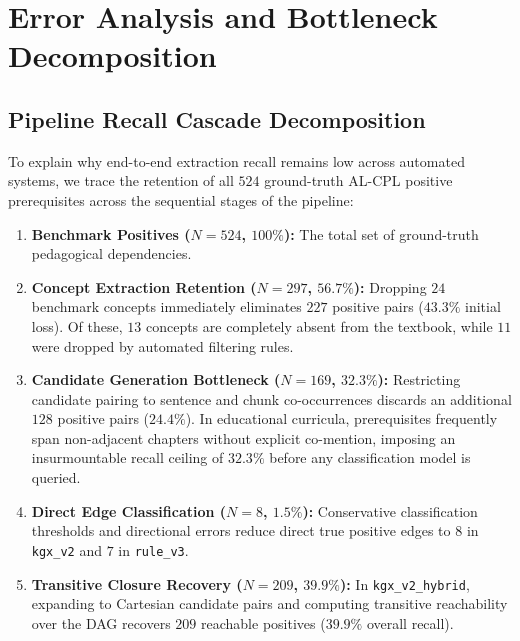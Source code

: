\section{Error Analysis and Bottleneck Decomposition}
\label{sec:error_analysis}

\subsection{Pipeline Recall Cascade Decomposition}
To explain why end-to-end extraction recall remains low across automated systems, we trace the retention of all $524$ ground-truth AL-CPL positive prerequisites across the sequential stages of the pipeline:

\begin{enumerate}[leftmargin=*]
    \item \textbf{Benchmark Positives ($N=524$, $100\%$):} The total set of ground-truth pedagogical dependencies.
    \item \textbf{Concept Extraction Retention ($N=297$, $56.7\%$):} Dropping $24$ benchmark concepts immediately eliminates $227$ positive pairs ($43.3\%$ initial loss). Of these, $13$ concepts are completely absent from the textbook, while $11$ were dropped by automated filtering rules.
    \item \textbf{Candidate Generation Bottleneck ($N=169$, $32.3\%$):} Restricting candidate pairing to sentence and chunk co-occurrences discards an additional $128$ positive pairs ($24.4\%$). In educational curricula, prerequisites frequently span non-adjacent chapters without explicit co-mention, imposing an insurmountable recall ceiling of $32.3\%$ before any classification model is queried.
    \item \textbf{Direct Edge Classification ($N=8$, $1.5\%$):} Conservative classification thresholds and directional errors reduce direct true positive edges to $8$ in \texttt{kgx\_v2} and $7$ in \texttt{rule\_v3}.
    \item \textbf{Transitive Closure Recovery ($N=209$, $39.9\%$):} In \texttt{kgx\_v2\_hybrid}, expanding to Cartesian candidate pairs and computing transitive reachability over the DAG recovers $209$ reachable positives ($39.9\%$ overall recall).
\end{enumerate}

